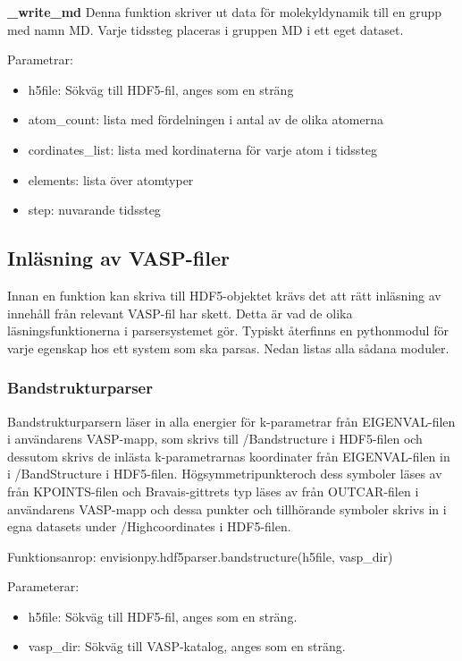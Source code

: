 \documentclass[10pt,oneside,swedish]{article}
\providecommand{\tightlist}{%
  \setlength{\itemsep}{0pt}\setlength{\parskip}{0pt}}
\begin{document}
\textbf{\_write\_md} Denna funktion skriver ut data för molekyldynamik till en grupp med namn MD. Varje tidssteg placeras i gruppen MD i ett eget dataset.

Parametrar:
\begin{itemize}
\tightlist
\item h5file: Sökväg till HDF5-fil, anges som en sträng
\item atom\_count: lista med fördelningen i antal av de olika atomerna
\item cordinates\_list: lista med kordinaterna för varje atom i tidssteg
\item elements: lista över atomtyper 
\item step: nuvarande tidssteg
\end{itemize}
\subsection{Inläsning av VASP-filer}\label{inluxe4sning-av-vasp-filer}

Innan en funktion kan skriva till HDF5-objektet krävs det att rätt
inläsning av innehåll från relevant VASP-fil har skett. Detta är vad de
olika läsningsfunktionerna i parsersystemet gör. Typiskt återfinns en
pythonmodul för varje egenskap hos ett system som ska parsas. Nedan
listas alla sådana moduler.

\subsubsection{Bandstrukturparser}\label{bandstrukturparser}

Bandstrukturparsern läser in alla energier för k-parametrar från
EIGENVAL-filen i användarens VASP-mapp, som skrivs till /Bandstructure i
HDF5-filen och dessutom skrivs de inlästa k-parametrarnas koordinater
från EIGENVAL-filen in i /BandStructure i HDF5-filen.
Högsymmetripunkteroch dess symboler läses av från KPOINTS-filen och
Bravais-gittrets typ läses av från OUTCAR-filen i användarens VASP-mapp
och dessa punkter och tillhörande symboler skrivs in i egna datasets
under /Highcoordinates i HDF5-filen.

Funktionsanrop: envisionpy.hdf5parser.bandstructure(h5file, vasp\_dir)

Parameterar:

\begin{itemize}
\tightlist
\item
  h5file: Sökväg till HDF5-fil, anges som en sträng.
\item
  vasp\_dir: Sökväg till VASP-katalog, anges som en sträng.
\end{itemize}
\end{document}
